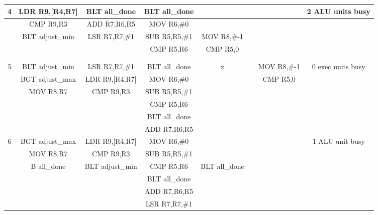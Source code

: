 \documentclass{article}
\begin{document}
{\begin{landscape}
\begin{longtable}{|c|c|c|c|c:c|c|c|}
    4 & LDR R9,[R4,R7] & BLT all\_done & BLT all\_done & & & & 2 ALU units busy \\ \hline
     & CMP R9,R3 & ADD R7,R6,R5 & MOV R6,\#0 & & & & \\ \hline
     & BLT adjust\_min & LSR R7,R7,\#1 & SUB R5,R5,\#1 & MOV R8,\#-1 &  & & \\ \hline
     &  &  & CMP R5,R6 & CMP R5,0 &  & & \\ \hline
     &  &  & &  &  &  & \\ \hline
     &  &  & &  &  &  & \\ \hline \hline
     
    5 & BLT adjust\_min & LSR R7,R7,\#1 & BLT all\_done & x & & MOV R8,\#-1 & 0 exec units busy \\ \hline
     & BGT adjust\_max & LDR R9,[R4,R7] & MOV R6,\#0 & & & CMP R5,0 & \\ \hline
     & MOV R8,R7 & CMP R9,R3 & SUB R5,R5,\#1 & &  & & \\ \hline
     &  &  & CMP R5,R6 & &  & & \\ \hline
     &  &  & BLT all\_done &  &  &  & \\ \hline
     &  &  & ADD R7,R6,R5 &  &  &  & \\ \hline \hline
     
    6 & BGT adjust\_max & LDR R9,[R4,R7] & MOV R6,\#0 & & & & 1 ALU unit busy \\ \hline
     & MOV R8,R7 & CMP R9,R3 & SUB R5,R5,\#1 & & & & \\ \hline
     & B all\_done & BLT adjust\_min & CMP R5,R6 & BLT all\_done &  & & \\ \hline
     &  &  & BLT all\_done & &  & & \\ \hline
     &  &  & ADD R7,R6,R5 &  &  &  & \\ \hline
     &  &  & LSR R7,R7,\#1 &  &  &  & \\ \hline \hline
     

\end{longtable}
\end{landscape}}
\end{document}

